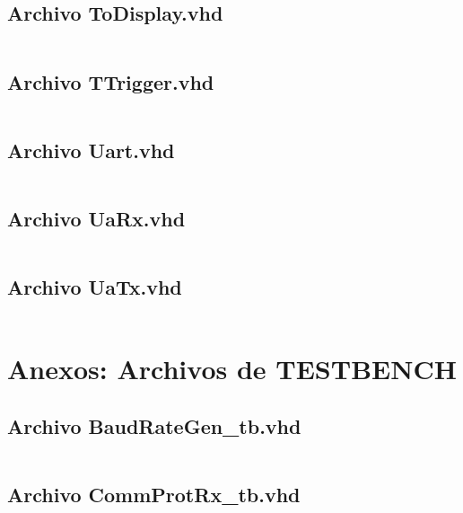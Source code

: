 \documentclass[12pt]{article}
\begin{document}
\subsection{Archivo \textbf{ToDisplay.vhd}}
\inputminted[bgcolor=bgcodecolor,xleftmargin=20pt,breaklines,linenos,fontsize=\scriptsize]{vhdl}{../GHDL/ToDisplay.vhd}
\newpage

\subsection{Archivo \textbf{TTrigger.vhd}}
\inputminted[bgcolor=bgcodecolor,xleftmargin=20pt,breaklines,linenos,fontsize=\scriptsize]{vhdl}{../GHDL/TTrigger.vhd}
\newpage

\subsection{Archivo \textbf{Uart.vhd}}
\inputminted[bgcolor=bgcodecolor,xleftmargin=20pt,breaklines,linenos,fontsize=\scriptsize]{vhdl}{../GHDL/Uart.vhd}
\newpage

\subsection{Archivo \textbf{UaRx.vhd}}
\inputminted[bgcolor=bgcodecolor,xleftmargin=20pt,breaklines,linenos,fontsize=\scriptsize]{vhdl}{../GHDL/UaRx.vhd}
\newpage

\subsection{Archivo \textbf{UaTx.vhd}}
\inputminted[bgcolor=bgcodecolor,xleftmargin=20pt,breaklines,linenos,fontsize=\scriptsize]{vhdl}{../GHDL/UaTx.vhd}

\section{Anexos: Archivos de TESTBENCH}

\subsection{Archivo \textbf{BaudRateGen\_tb.vhd }}
\inputminted[bgcolor=bgcodecolor,xleftmargin=20pt,breaklines,linenos,fontsize=\scriptsize]{vhdl}{../GHDL/BaudRateGen_tb.vhd}
\newpage

\subsection{Archivo \textbf{CommProtRx\_tb.vhd }}
\inputminted[bgcolor=bgcodecolor,xleftmargin=20pt,breaklines,linenos,fontsize=\scriptsize]{vhdl}{../GHDL/CommProtRx_tb.vhd}
\newpage
\end{document}
